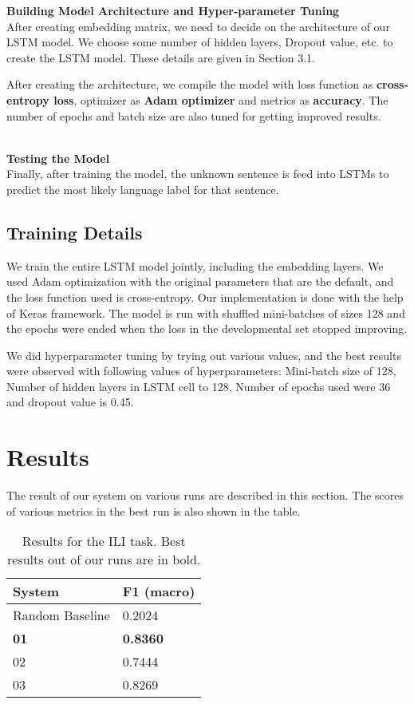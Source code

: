 \documentclass[11pt]{article}
\begin{document}
\noindent \textbf{Building Model Architecture and Hyper-parameter Tuning}
~\\
After creating embedding matrix, we need to decide on the architecture of our LSTM model. We choose some number of hidden layers, Dropout value, etc. to create the LSTM model. These details are given in Section 3.1.

After creating the architecture, we compile the model with loss function as \textbf{cross-entropy loss}, optimizer as \textbf{Adam optimizer} and metrics as \textbf{accuracy}. The number of epochs and batch size are also tuned for getting improved results.

~\\
\noindent \textbf{Testing the Model}
~\\

Finally, after training the model, the unknown sentence is feed into LSTMs to predict the most likely language label for that sentence.

\subsection{Training Details}

We train the entire LSTM model jointly, including the embedding layers. We used Adam optimization \cite{kingma2014adam} with the original parameters that are the default, and the loss function used is cross-entropy. Our implementation is done with the help of Keras framework. The model is run with 
shuffled mini-batches of sizes 128 and the epochs were ended when the loss in the developmental set stopped improving.

We did hyperparameter tuning by trying out various values, and the best results were observed with following values of hyperparameters: Mini-batch size of 128, Number of hidden layers in LSTM cell to 128, Number of epochs used were 36 and dropout value is 0.45.


\section{Results}
\label{sec:results}

The result of our system on various runs are described in this section. The scores of various metrics in the best run is also shown in the table.


\begin{table*}[h]
\center
\begin{tabular}{|ll|}
\hline
\bf System & \bf F1 (macro) \\ 
\hline
Random Baseline & 0.2024 \\
\hline
\textbf{01} & \textbf{0.8360} \\
02 & 0.7444 \\
03 & 0.8269 \\
\hline
\end{tabular}\\
\\
\caption{Results for the ILI task. Best results out of our runs are in bold.}
\label{tab:results-ILI-open}
\end{table*}
\end{document}

